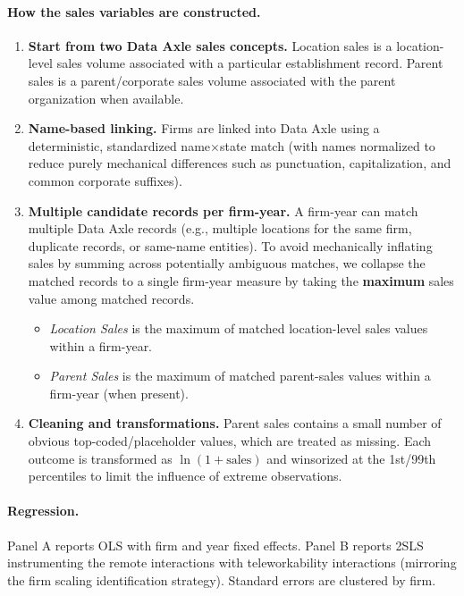 \documentclass{article}
\newcommand{\cleanedresultsdir}{../results/cleaned/tex}
\begin{document}
\paragraph{How the sales variables are constructed.}
\begin{enumerate}
  \item \textbf{Start from two Data Axle sales concepts.} Location sales is a location-level sales volume associated with a particular establishment record. Parent sales is a parent/corporate sales volume associated with the parent organization when available.
  \item \textbf{Name-based linking.} Firms are linked into Data Axle using a deterministic, standardized name$\times$state match (with names normalized to reduce purely mechanical differences such as punctuation, capitalization, and common corporate suffixes).
  \item \textbf{Multiple candidate records per firm-year.} A firm-year can match multiple Data Axle records (e.g., multiple locations for the same firm, duplicate records, or same-name entities). To avoid mechanically inflating sales by summing across potentially ambiguous matches, we collapse the matched records to a single firm-year measure by taking the \textbf{maximum} sales value among matched records.
  \begin{itemize}
    \item \textit{Location Sales} is the maximum of matched location-level sales values within a firm-year.
    \item \textit{Parent Sales} is the maximum of matched parent-sales values within a firm-year (when present).
  \end{itemize}
  \item \textbf{Cleaning and transformations.} Parent sales contains a small number of obvious top-coded/placeholder values, which are treated as missing. Each outcome is transformed as $\ln(1+\text{sales})$ and winsorized at the 1st/99th percentiles to limit the influence of extreme observations.
\end{enumerate}

\paragraph{Regression.}
Panel A reports OLS with firm and year fixed effects. Panel B reports 2SLS instrumenting the remote interactions with teleworkability interactions (mirroring the firm scaling identification strategy). Standard errors are clustered by firm.

\begin{table}[h!]
\caption{\textbf{Firm Sales Spec with Data Axle Sales Outcomes}}

\end{table}
\end{document}
